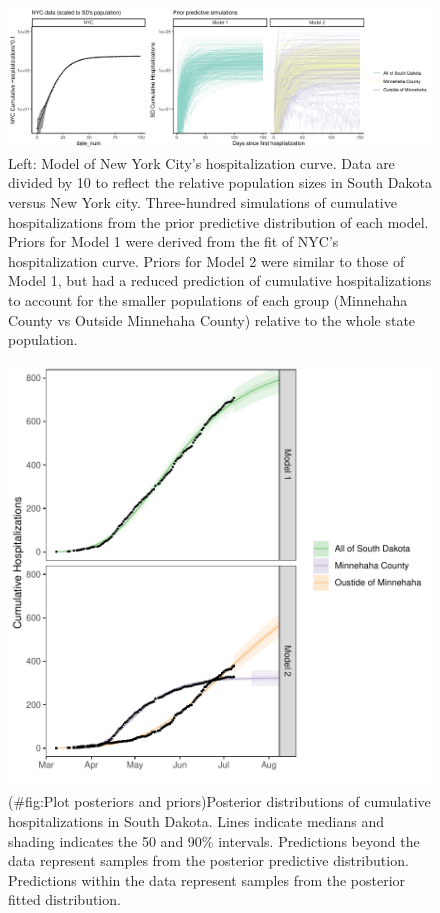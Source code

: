 \documentclass[
]{article}
\begin{document}
\begin{figure}
\centering
\includegraphics{manuscript_files/figure-latex/plot-nyc-1.pdf}
\caption{\label{fig:plot-nyc}Left: Model of New York City's hospitalization curve. Data are divided by 10 to reflect the relative population sizes in South Dakota versus New York city. Three-hundred simulations of cumulative hospitalizations from the prior predictive distribution of each model. Priors for Model 1 were derived from the fit of NYC's hospitalization curve. Priors for Model 2 were similar to those of Model 1, but had a reduced prediction of cumulative hospitalizations to account for the smaller populations of each group (Minnehaha County vs Outside Minnehaha County) relative to the whole state population.\label{prior:plot}}
\end{figure}

\begin{figure}
\centering
\includegraphics{manuscript_files/figure-latex/Plot posteriors and priors-1.pdf}
\caption{(\#fig:Plot posteriors and priors)Posterior distributions of cumulative hospitalizations in South Dakota. Lines indicate medians and shading indicates the 50 and 90\% intervals. Predictions beyond the data represent samples from the posterior predictive distribution. Predictions within the data represent samples from the posterior fitted distribution.\label{post_all:plot}}
\end{figure}
\end{document}
